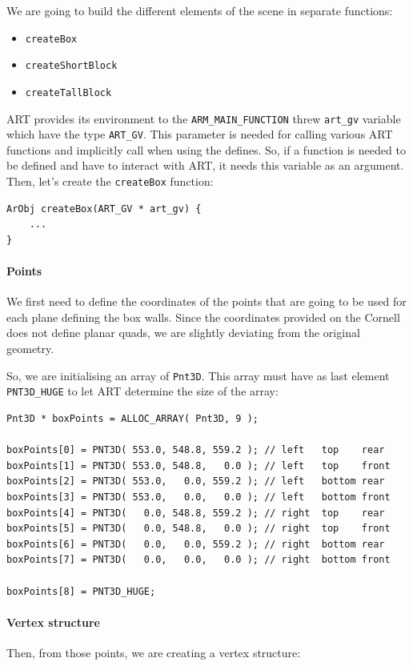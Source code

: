 \documentclass[a4paper,chapterprefix]{scrbook}
\begin{document}
We are going to build the different elements of the scene in separate functions:
\begin{itemize}
	\item \verb?createBox?
	\item \verb?createShortBlock?
	\item \verb?createTallBlock?
\end{itemize}

ART provides its environment to the \verb?ARM_MAIN_FUNCTION? threw \verb?art_gv? variable which have the type \verb?ART_GV?. This parameter is needed for calling various ART functions and implicitly call when using the defines. So, if a function is needed to be defined and have to interact with ART, it needs this variable as an argument. Then, let's create the \verb?createBox? function:

\begin{lstlisting}
ArObj createBox(ART_GV * art_gv) {
    ...
}
\end{lstlisting}

\paragraph{Points}
We first need to define the coordinates of the points that are going to be used for each plane defining the box walls.
Since the coordinates provided on the Cornell does not define planar quads, we are slightly deviating from the original geometry.

So, we are initialising an array of \verb?Pnt3D?. This array must have as last element \verb?PNT3D_HUGE? to let ART determine the size of the array:

\begin{lstlisting}
Pnt3D * boxPoints = ALLOC_ARRAY( Pnt3D, 9 );

boxPoints[0] = PNT3D( 553.0, 548.8, 559.2 ); // left   top    rear
boxPoints[1] = PNT3D( 553.0, 548.8,   0.0 ); // left   top    front
boxPoints[2] = PNT3D( 553.0,   0.0, 559.2 ); // left   bottom rear
boxPoints[3] = PNT3D( 553.0,   0.0,   0.0 ); // left   bottom front
boxPoints[4] = PNT3D(   0.0, 548.8, 559.2 ); // right  top    rear
boxPoints[5] = PNT3D(   0.0, 548.8,   0.0 ); // right  top    front
boxPoints[6] = PNT3D(   0.0,   0.0, 559.2 ); // right  bottom rear
boxPoints[7] = PNT3D(   0.0,   0.0,   0.0 ); // right  bottom front

boxPoints[8] = PNT3D_HUGE;
\end{lstlisting}

\paragraph{Vertex structure}
Then, from those points, we are creating a vertex structure:
\end{document}

